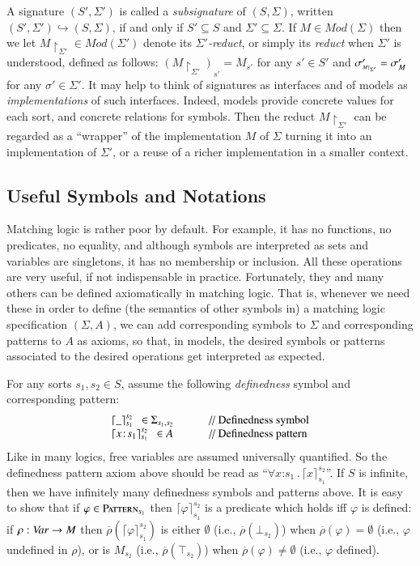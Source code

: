 \documentclass[UTF8,11pt]{article}
\theoremstyle{plain}
\theoremstyle{definition}
\theoremstyle{remark}
\newcommand{\cln}{\texttt{:}}
\newcommand{\Mod}{\textit{Mod}}
\newcommand{\reduct}[2]{\mbox{${#1}\!\!\upharpoonright_{#2}$}}
\newcommand{\reductscript}[2]{\mbox{\tiny${#1}\!\!\upharpoonright_{#2}$}}
\newcommand{\Pattern}{\textsc{Pattern}\xspace}
\newcommand{\ra}{\rightarrow}
\begin{document}
A signature $(S',\Sigma')$ is called a \emph{subsignature} of $(S,\Sigma)$, written
$(S',\Sigma') \hookrightarrow(S,\Sigma)$, if and only if $S' \subseteq S$ and
$\Sigma' \subseteq \Sigma$.
If $M \in \Mod(\Sigma)$ then we let
$\reduct{M}{\Sigma'} \in \Mod(\Sigma')$ denote its
\emph{$\Sigma'$-reduct}, or simply its \emph{reduct} when
$\Sigma'$ is understood, defined as follows:
$(\reduct{M}{\Sigma'})_{s'} = M_{s'}$ for any $s'\in S'$ and
$\sigma'_{\reductscript{M}{\Sigma'}} = \sigma'_M$ for any $\sigma'\in\Sigma'$.
It may help to think of signatures as interfaces and of models as
\emph{implementations} of such interfaces.
Indeed, models provide concrete values for each sort, and concrete relations
for symbols.
Then the reduct $\reduct{M}{\Sigma'}$ can be regarded as a ``wrapper'' of
the implementation $M$ of $\Sigma$ turning it into an implementation of
$\Sigma'$, or a reuse of a richer implementation in a smaller context.

\subsection{Useful Symbols and Notations}
\label{sec:useful}

Matching logic is rather poor by default.
For example, it has no functions, no predicates, no equality, and although
symbols are interpreted as sets and variables are singletons, it has no
membership or inclusion.
All these operations are very useful, if not indispensable in practice.
Fortunately, they and many others can be defined axiomatically in matching
logic.
That is, whenever we need these in order to define (the semantics of other
symbols in) a matching logic specification $(\Sigma,A)$, we can add
corresponding symbols to $\Sigma$ and corresponding patterns to $A$ as axioms,
so that, in models, the desired symbols or patterns associated to the
desired operations get interpreted as expected.

For any sorts $s_1,s_2\in S$, assume the following \emph{definedness}
symbol and corresponding pattern:
$$
\begin{array}{l@{\hspace*{7ex}}l}
\lceil\_\rceil_{s_1}^{s_2} \ \ \in \Sigma_{s_1,s_2}
& \textrm{// Definedness symbol} \\
\lceil x\!:\! s_1 \rceil_{s_1}^{s_2} \ \ \in A &
\textrm{// Definedness pattern}
\end{array}
$$
Like in many logics, free variables are assumed universally quantified.
So the definedness pattern axiom above should be read as
``$\forall x\cln s_1\,.\,\lceil x \rceil_{s_1}^{s_2}$''.
If $S$ is infinite, then we have infinitely many definedness symbols and patterns
above.
It is easy to show that if $\varphi \in \Pattern_{s_1}$ then
$\lceil\varphi\rceil_{s_1}^{s_2}$ is a predicate which holds iff $\varphi$ is
defined:
if $\rho : \Var \ra M$ then
$\overline{\rho}(\lceil\varphi\rceil_{s_1}^{s_2})$ is either $\emptyset$
(i.e., $\overline{\rho}(\bot_{s_2})$)
when $\overline{\rho}(\varphi) = \emptyset$
(i.e., $\varphi$ undefined in $\rho$), or is $M_{s_2}$
(i.e., $\overline{\rho}(\top_{s_2})$)
when $\overline{\rho}(\varphi) \neq \emptyset$ (i.e., $\varphi$ defined).
\end{document}
